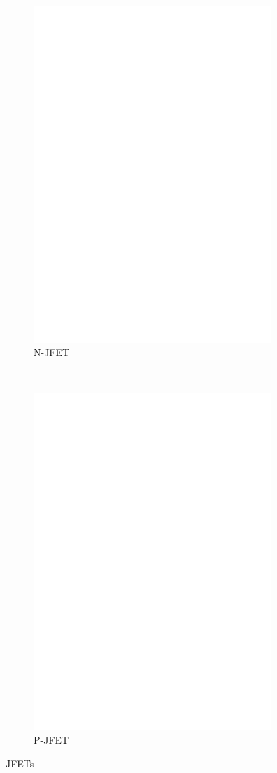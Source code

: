 \begin{figure}[H]
  \begin{subfigure}[b]{9cm}
    \centering
    \includegraphics[width=9cm]{../FIG/JFET_BF245.eps}
    \caption{N-JFET}
    \label{fig:N-JFET}
  \end{subfigure}
  ~
  \begin{subfigure}[b]{9cm}
    \centering
    \includegraphics[width=9cm]{../FIG/JFET_J175.eps}
    \caption{P-JFET}
    \label{fig:P-JFET}
  \end{subfigure}
  \caption{JFETs}
\end{figure}



